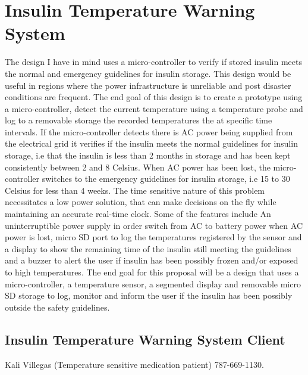 \pagestyle{plain}
\chapter{Insulin Temperature Warning System}
The design I have in mind uses a micro-controller to verify if stored insulin meets the normal and emergency guidelines for insulin storage. This design would be useful in regions where the power infrastructure is unreliable and post disaster conditions are frequent. The end goal of this design is to create a prototype using a micro-controller, detect the current temperature using a temperature probe and log to a removable storage the recorded temperatures the at specific time intervals. If the micro-controller detects there is AC power being supplied from the electrical grid it verifies if the insulin meets the normal guidelines for insulin storage, i.e that the insulin is less than 2 months in storage and has been kept consistently between 2 and 8 Celsius. When AC power has been lost, the micro-controller switches to the emergency guidelines for insulin storage, i.e 15 to 30 Celsius for less than 4 weeks. The time sensitive nature of this problem necessitates a low power solution, that can make decisions on the fly while maintaining an accurate real-time clock. Some of the features include An uninterruptible power supply in order switch from AC to battery power when AC power is lost, micro SD port to log the temperatures registered by the sensor and a display to show the remaining time of the insulin still meeting the guidelines and a buzzer to alert the user if insulin has been possibly frozen and/or exposed to high temperatures. The end goal for this proposal will be a design that uses a micro-controller, a temperature sensor, a segmented display and removable micro SD storage to log, monitor and inform the user if the insulin has been possibly outside the safety guidelines.
\newpage
\section{Insulin Temperature Warning System Client}
Kali Villegas (Temperature sensitive medication patient) 787-669-1130.
